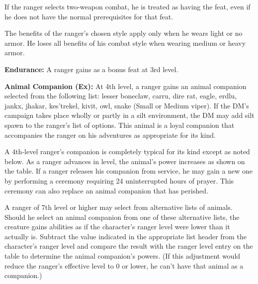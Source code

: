 If the ranger selects two-weapon combat, he is treated as having the  feat, even if he does not have the normal prerequisites for that feat.

The benefits of the ranger's chosen style apply only when he wears light or no armor. He loses all benefits of his combat style when wearing medium or heavy armor.

\textbf{Endurance:} A ranger gains  as a bonus feat at 3rd level.

\textbf{Animal Companion (Ex):} At 4th level, a ranger gains an animal companion selected from the following list: lesser boneclaw, carru, dire rat, eagle, erdlu, jankx, jhakar, kes'trekel, kivit, owl, snake (Small or Medium viper). If the DM's campaign takes place wholly or partly in a silt environment, the DM may add silt spawn to the ranger's list of options. This animal is a loyal companion that accompanies the ranger on his adventures as appropriate for its kind. 

A 4th-level ranger's companion is completely typical for its kind except as noted below. As a ranger advances in level, the animal's power increases as shown on the table. If a ranger releases his companion from service, he may gain a new one by performing a ceremony requiring 24 uninterrupted hours of prayer. This ceremony can also replace an animal companion that has perished.

A ranger of 7th level or higher may select from alternative lists of animals. Should he select an animal companion from one of these alternative lists, the creature gains abilities as if the character's ranger level were lower than it actually is. Subtract the value indicated in the appropriate list header from the character's ranger level and compare the result with the ranger level entry on the table to determine the animal companion's powers. (If this adjustment would reduce the ranger's effective level to 0 or lower, he can't have that animal as a companion.)


